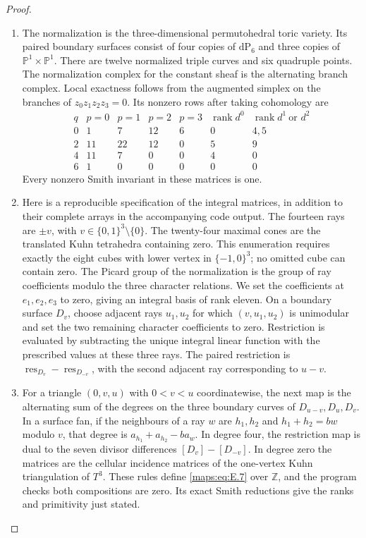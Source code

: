 \begin{proof}
\begin{enumerate}[label=\arabic*.,leftmargin=*]
\item The normalization is the three-dimensional permutohedral toric variety.
Its paired boundary surfaces consist of four copies of $\mathrm{dP}_6$
and three copies of $\mathbb P^1\times\mathbb P^1$.  There are twelve
normalized triple curves and six quadruple points.  The normalization
complex for the constant sheaf is the alternating branch complex.
Local exactness follows from the augmented simplex on the branches
of $z_0z_1z_2z_3=0$.  Its nonzero rows after taking cohomology are
\[
\begin{array}{c|rrrr|rr}
q& p=0&p=1&p=2&p=3&\operatorname{rank}d^0&
 \operatorname{rank}d^1\ \text{or }d^2\\ \hline
0&1&7&12&6&0&4,5\\
2&11&22&12&0&5&9\\
4&11&7&0&0&4&0\\
6&1&0&0&0&0&0
\end{array}
\tag{E.7}\label{maps:eq:E.7}
\]
Every nonzero Smith invariant in these matrices is one.

\item Here is a reproducible specification of the integral matrices, in
addition to their complete arrays in the accompanying code output.
The fourteen rays are $\pm v$, with
$v\in\{0,1\}^3\setminus\{0\}$.  The twenty-four maximal cones
are the translated Kuhn tetrahedra containing zero.  This enumeration
requires exactly the eight cubes with lower vertex in $\{-1,0\}^3$;
no omitted cube can contain zero.  The Picard group of the normalization
is the group of ray coefficients modulo the three character relations.
We set the coefficients at $e_1,e_2,e_3$ to zero, giving an integral
basis of rank eleven.  On a boundary surface $D_v$, choose adjacent
rays $u_1,u_2$ for which $(v,u_1,u_2)$ is unimodular and set the two
remaining character coefficients to zero.  Restriction is evaluated
by subtracting the unique integral linear function with the prescribed
values at these three rays.  The paired restriction is
$\operatorname{res}_{D_v}-\operatorname{res}_{D_{-v}}$, with the
second adjacent ray corresponding to $u-v$.

\item For a triangle $(0,v,u)$ with $0<v<u$ coordinatewise, the next map
is the alternating sum of the degrees on the three boundary curves
of $D_{u-v},D_u,D_v$.  In a surface fan, if the neighbours of a ray
$w$ are $h_1,h_2$ and $h_1+h_2=bw$ modulo $v$, that degree is
$a_{h_1}+a_{h_2}-ba_w$.  In degree four, the restriction map is dual
to the seven divisor differences $[D_v]-[D_{-v}]$.  In degree zero
the matrices are the cellular incidence matrices of the one-vertex
Kuhn triangulation of $T^3$.  These rules define \eqref{maps:eq:E.7} over
$\mathbb Z$, and the program checks both compositions are zero.
Its exact Smith reductions give the ranks and primitivity just stated.


\end{enumerate}
\end{proof}
